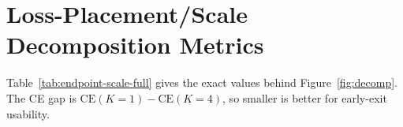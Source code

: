 \section{Loss-Placement/Scale Decomposition Metrics}
\label{app:endpoint-scale}

Table~\ref{tab:endpoint-scale-full} gives the exact values behind Figure~\ref{fig:decomp}.
The CE gap is $\mathrm{CE}(K{=}1)-\mathrm{CE}(K{=}4)$, so smaller is better for early-exit usability.

\begin{table}[h]
\centering
\small
\caption{Exact loss-placement/scale decomposition values for the controlled 2$\times$2, evaluated with the variable-depth slice harness; per-loop PPL values are the 3-seed means of Table~\ref{tab:depth}, and the 129M terminal values correspond to the cross-entropies in Table~\ref{tab:terminal-depth}. Absolute PPL is therefore lower than the training-time full-validation values in Table~\ref{tab:main}. Per-loop CE marks whether cross-entropy is applied at every loop. Scale-visible marks raw readouts, which expose hidden-state magnitude to the CE loss.}
\label{tab:endpoint-scale-full}
\resizebox{\linewidth}{!}{}
\end{table}

